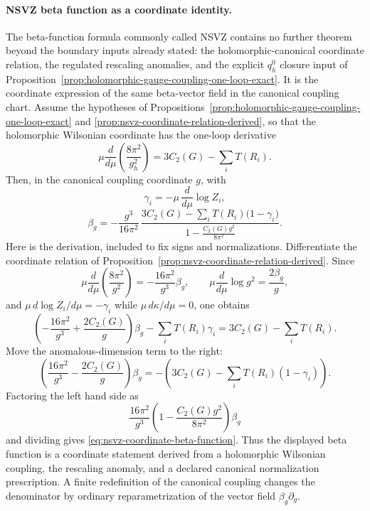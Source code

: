 \paragraph{NSVZ beta function as a coordinate identity.}
The beta-function formula commonly called NSVZ contains no further theorem
beyond the boundary inputs already stated: the holomorphic-canonical coordinate
relation, the regulated rescaling anomalies, and the explicit \(q_h^0\)
closure input of
Proposition~\ref{prop:holomorphic-gauge-coupling-one-loop-exact}.  It is the
coordinate expression of the same beta-vector field in the canonical coupling
chart.  Assume the hypotheses of
Propositions~\ref{prop:holomorphic-gauge-coupling-one-loop-exact} and
\ref{prop:nsvz-coordinate-relation-derived}, so that the holomorphic Wilsonian
coordinate has the one-loop derivative
\begin{equation}
  \mu\frac{d}{d\mu}\left(\frac{8\pi^2}{g_h^2}\right)
  =
  3C_2(G)-\sum_iT(R_i).
  \label{eq:holomorphic-coordinate-one-loop-derivative}
\end{equation}
Then, in the canonical coupling coordinate \(g\), with
\[
  \gamma_i=-\mu\,\frac{d}{d\mu}\log Z_i ,
\]
\begin{equation}
  \beta_g
  =
  -\frac{g^3}{16\pi^2}\,
  \frac{
    3C_2(G)-\sum_iT(R_i)\bigl(1-\gamma_i\bigr)
  }{
    1-\frac{C_2(G)g^2}{8\pi^2}
  } .
  \tag{NSVZ}
  \label{eq:nsvz-coordinate-beta-function}
\end{equation}
Here is the derivation, included to fix signs and normalizations.  Differentiate
the coordinate relation of
Proposition~\ref{prop:nsvz-coordinate-relation-derived}.  Since
\[
  \mu\frac{d}{d\mu}\left(\frac{8\pi^2}{g^2}\right)
  =
  -\frac{16\pi^2}{g^3}\beta_g,
  \qquad
  \mu\frac{d}{d\mu}\log g^2=\frac{2\beta_g}{g},
\]
and \(\mu\,d\log Z_i/d\mu=-\gamma_i\) while
\(\mu\,d\kappa/d\mu=0\), one obtains
\[
  \left(
    -\frac{16\pi^2}{g^3}
    +
    \frac{2C_2(G)}{g}
  \right)\beta_g
  -
  \sum_iT(R_i)\gamma_i
  =
  3C_2(G)-\sum_iT(R_i).
\]
Move the anomalous-dimension term to the right:
\[
  \left(
    \frac{16\pi^2}{g^3}
    -
    \frac{2C_2(G)}{g}
  \right)\beta_g
  =
  -
  \left(
    3C_2(G)-\sum_iT(R_i)(1-\gamma_i)
  \right).
\]
Factoring the left hand side as
\[
  \frac{16\pi^2}{g^3}
  \left(
    1-\frac{C_2(G)g^2}{8\pi^2}
  \right)\beta_g
\]
and dividing gives \eqref{eq:nsvz-coordinate-beta-function}.  Thus the
displayed beta function is a coordinate statement derived from a holomorphic
Wilsonian coupling, the rescaling anomaly, and a declared canonical
normalization prescription.  A finite redefinition of the canonical coupling
changes the denominator by ordinary reparametrization of the vector field
\(\beta_g\partial_g\).

